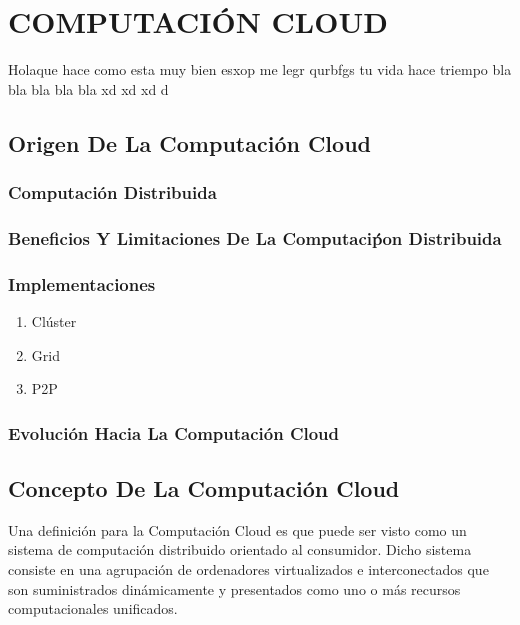 \documentclass[a4paper, 12pt]{report}
\begin{document}
\chapter{COMPUTACI\'ON CLOUD}
\pagestyle{plain}
\vspace*{-2em}
\begin{justify}
Holaque hace como esta muy bien esxop me legr qurbfgs tu vida hace triempo bla bla bla bla bla xd xd xd d
\end{justify}
\section{Origen De La Computaci\'on Cloud}
\subsection{Computaci\'on Distribuida}
\subsection{Beneficios Y Limitaciones De La Computaci\'pon Distribuida}
\subsection{Implementaciones}
\begin{enumerate}[label=\alph*)]
    \item{Cl\'uster}
    \item{Grid}
    \item{P2P}
\end{enumerate}
\subsection{Evoluci\'on Hacia La Computaci\'on Cloud}
\section{Concepto De La Computaci\'on Cloud}
\begin{justify}
Una definici\'on para la Computaci\'on Cloud es que puede ser visto como un sistema de computaci\'on distribuido orientado al consumidor. Dicho sistema consiste en una agrupaci\'on de ordenadores virtualizados e interconectados que son suministrados din\'amicamente y presentados como uno o m\'as recursos computacionales unificados.
\end{justify}
\end{document}
